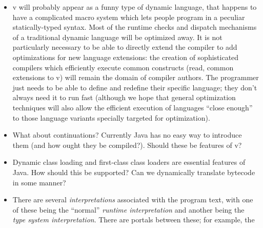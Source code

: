 \documentclass[11pt,notitlepage,twocolumn]{article}
\newcommand{\vlang}{\textsf{v}\xspace}
\newcommand{\reasoning}{\par\textbf{Reasoning:}\xspace}
\begin{document}
\begin{itemize}
  The idea is that rules are methods, and grammars are classes.  There
  is always one predefined grammar, \texttt{v.lang.Grammar}, which you
  can subclass to override rules of.  Rules return a match object with
  all sorts of fun properties---this would be the abstract syntax or
  parse tree for \texttt{v.lang.Grammar}.  Rules may have parameters,
  like methods have.

  In Perl 6, subroutines may have the \texttt{is parsed(grm)} trait to
  indicate that they should be parsed by rule \texttt{grm}.
  Subroutines may also be declared as \texttt{macros}, which just
  means they are executed at compile-time.  Any block may be executed
  at compile-time, which is how modifications to the current grammar
  are made.  These modifications are lexically-scoped.

  \reasoning
  Integrated support for the various syntax changes:
  \texttt{strictfp}, for-each syntax.
\item \vlang will probably appear as a funny type of dynamic language,
  that happens to have a complicated macro system which lets people
  program in a peculiar statically-typed syntax.  Most of the
  runtime checks and dispatch mechanisms of a traditional dynamic
  language will be optimized away.  It is not particularly
  necessary to be able to directly extend the compiler to add
  optimizations for new language extensions: the creation of
  sophisticated compilers which efficiently execute common constructs
  (read, common extensions to \vlang) will remain the domain of compiler
  authors.   The programmer just needs to be able to define and
  redefine their specific language; they don't always need it to run
  fast (although we hope that general optimization techniques will
  also allow the efficient execution of languages ``close enough'' to
  those language variants specially targeted for optimization).
\item What about continuations?  Currently Java has no easy way to
  introduce them (and how ought they be compiled?).  Should these be
  features of \vlang?
\item Dynamic class loading and first-class class loaders are
  essential features of Java.  How should this be supported?  Can we
  dynamically translate bytecode in some manner?
\item There are several \emph{interpretations} associated with the
  program text, with one of these being the ``normal'' \emph{runtime
  interpretation} and another being the \emph{type system
  interpretation}.  There are portals between these; for example, the

\end{itemize}
\end{document}
